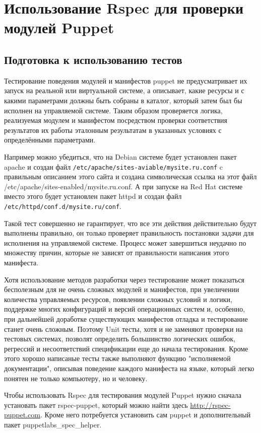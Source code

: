 \chapter{Использование Rspec для проверки модулей Puppet}

\section{Подготовка к использованию тестов}

Тестирование поведения модулей и манифестов puppet не предусматривает их запуск на реальной или виртуальной системе, а описывает, какие ресурсы и с какими параметрами должны быть собраны в каталог, который затем был бы исполнен на управляемой системе. Таким образом проверяется логика, реализуемая модулем и манифестом посредством проверки соответствия результатов их работы эталонным результатам в указанных условиях с определёнными параметрами.

Например можно убедиться, что на Debian системе будет установлен пакет apache и создан файл \texttt{/etc/apache/sites-aviable/mysite.ru.conf} c правильным описанием этого сайта и создана символическая ссылка на этот файл /etc/apache/sites-enabled/mysite.ru.conf. А при запуске на Red Hat системе вместо этого будет установлен пакет httpd и создан файл \texttt{/etc/httpd/conf.d/mysite.ru/conf}.

Такой тест совершенно не гарантирует, что все эти действия действительно будут выполнены правильно, он только проверяет правильность постановки задачи для исполнения на управляемой системе. Процесс может завершиться неудачно по множеству причин, которые не зависят от правильности написания этого манифеста.

Хотя использование методов разработки через тестирование может показаться бесполезным для не очень сложных модулей и манифестов, при увеличении количества управляемых ресурсов, появлении сложных условий и логики, поддержке многих конфигураций и версий операционных систем и, особенно, при дальнейшей доработке существующих манифестов отладка и тестирование станет очень сложным. Поэтому Unit тесты, хотя и не заменяют проверки на тестовых системах, позволят определить большинство логических ошибок, регрессий и несоответствий спецификации еще до начала тестирования. Кроме этого хорошо написаные тесты также выполняют функцию "исполняемой документации", описывая поведение каждого манифеста на языке, который легко понятен не только компьютеру, но и человеку.

Чтобы использовать Rspec для тестирования модулей Puppet нужно сначала установать пакет rspec-puppet, который можно найти здесь \url{http://rspec-puppet.com}. Кроме него потребуется установить сам puppet и дополнительный пакет puppetlabs\_spec\_helper.

